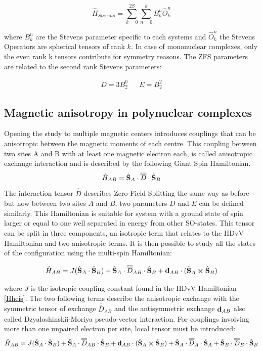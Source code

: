 \documentclass[12pt]{report}
\numberwithin{equation}{section}
\begin{document}
\begin{equation}
    \hat{H}_{Stevens}=\sum_{k=0}^{2S}\sum_{n=0}^{k}B_k^n\hat{O}_k^n
\end{equation}

where $B_k^n$ are the Stevens parameter specific to each systems and $\hat{O}_k^n$ the Stevens Operators are spherical tensors of rank $k$.
In case of mononuclear complexes, only the even rank k tensors contribute for symmetry reasons. 
The ZFS parameters are related to the second rank Stevens parameters:

\begin{align}
    D=3B_2^0 && E=B_2^2
\end{align}


\subsection{Magnetic anisotropy in polynuclear complexes}
Opening the study to multiple magnetic centers introduces couplings that can be anisotropic between the magnetic moments of each centre. 
This coupling between two sites A and B with at least one magnetic electron each, is called anisotropic exchange interaction and is described by the following Giant Spin Hamiltonian.
\begin{equation}
    \hat{H}_{AB}=\hat{\vb S}_A\cdot \overline{\overline{D}} \cdot \hat{\vb S}_B
\end{equation}
The interaction tensor $\overline{\overline{D}}$ describes Zero-Field-Splitting the same way as before but now between two sites $A$ and $B$, two parameters $D$ and $E$ can be defined similarly. 
This Hamiltonian is suitable for system with a ground state of spin larger or equal to one well separated in energy from other SO-states.
This tensor can be split in three components, an isotropic term that relates to the HDvV Hamiltonian and two anisotropic terms.
It is then possible to study all the states of the configuration using the multi-spin Hamiltonian:

\begin{equation}
    \hat{H}_{AB}=J(\hat{\vb S}_A \cdot \hat{\vb S}_B) + \hat{\vb S}_A \cdot\overline{\overline{D}}_{AB} \cdot \hat{\vb S}_B + \vb{d}_{AB} \cdot (\hat{\vb S}_A \cross \hat{\vb S}_B)
\end{equation}

\noindent where $J$ is the isotropic coupling constant found in the HDvV Hamiltonian \ref{Hheis}.
The two following terms describe the anisotropic exchange with the symmetric tensor of exchange $\overline{\overline{D}}_{AB}$ and the antisymmetric exchange $\vb{d}_{AB}$ also called Dzyaloshinskii-Moriya pseudo-vector interaction.
For couplings involving more than one unpaired electron per site, local tensor must be introduced:
\begin{equation}\label{HMS}
    \hat{H}_{AB}=J(\hat{\vb S}_A \cdot \hat{\vb S}_B) + \hat{\vb S}_A \cdot\overline{\overline{D}}_{AB} \cdot \hat{\vb S}_B + \vb{d}_{AB} \cdot (\hat{\vb S}_A \cross \hat{\vb S}_B) +\hat{\vb S}_A \cdot\overline{\overline{D}}_{A} \cdot \hat{\vb S}_A +\hat{\vb S}_B \cdot\overline{\overline{D}}_{B} \cdot \hat{\vb S}_B
\end{equation}
\end{document}
